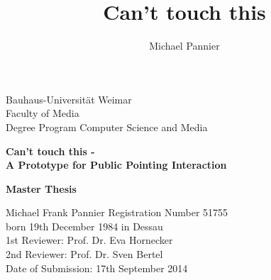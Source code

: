 
\begin{titlepage}
\large
\noindent
Bauhaus-Universität Weimar\\
Faculty of Media\\
Degree Program Computer Science and Media\\
\author{Michael Pannier}
\title{Can't touch this}
\vspace{20mm}
\begin{center}
    \huge{\bfseries{Can't touch this -\\
		A Prototype for Public Pointing Interaction}}
\end{center}
\vspace{15mm}
\begin{center}
    \huge{\bfseries{Master Thesis}}\\
\end{center}
\vspace{20mm}
Michael Frank Pannier
\hfill Registration Number 51755\\
born 19th December 1984 in Dessau\\
\newline
\newline
1st Reviewer: Prof. Dr. Eva Hornecker\\
2nd Reviewer: Prof. Dr. Sven Bertel\\
\vfil
\noindent
Date of Submission: 17th September 2014\\
\end{titlepage}
